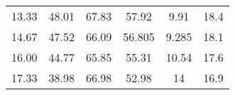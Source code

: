 \begin{table}[h!t]
\begin{tabular}{SSSSSS}
        13.33
        & 48.01
        & 67.83
        & 57.92
        & 9.91
        & 18.4 
        \\

        14.67
        & 47.52
        & 66.09
        & 56.805
        & 9.285
        & 18.1 
        \\

        16.00
        & 44.77
        & 65.85
        & 55.31
        & 10.54
        & 17.6 
        \\

        17.33
        & 38.98
        & 66.98
        & 52.98
        & 14
        & 16.9 
        \\

        \bottomrule
    \end{tabular}
\end{table}
